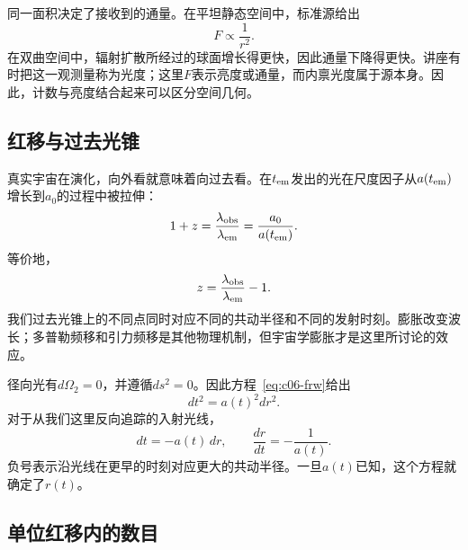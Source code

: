 同一面积决定了接收到的通量。在平坦静态空间中，标准源给出
\begin{equation}
F\propto\frac{1}{r^2}.
\end{equation}
在双曲空间中，辐射扩散所经过的球面增长得更快，因此通量下降得更快。讲座有时把这一观测量称为光度；这里\(F\)表示亮度或通量，而内禀光度属于源本身。因此，计数与亮度结合起来可以区分空间几何。

\subsection{红移与过去光锥}

真实宇宙在演化，向外看就意味着向过去看。在\(t_{\rm em}\)发出的光在尺度因子从\(a(t_{\rm em})\)增长到\(a_0\)的过程中被拉伸：
\begin{equation}
1+z
=\frac{\lambda_{\rm obs}}{\lambda_{\rm em}}
=\frac{a_0}{a(t_{\rm em})}.
\label{eq:c06-redshift}
\end{equation}
等价地，
\begin{equation}
z=\frac{\lambda_{\rm obs}}{\lambda_{\rm em}}-1.
\end{equation}
我们过去光锥上的不同点同时对应不同的共动半径和不同的发射时刻。膨胀改变波长；多普勒频移和引力频移是其他物理机制，但宇宙学膨胀才是这里所讨论的效应。

\begin{classroomqa}
\end{classroomqa}

径向光有\(d\Omega_2=0\)，并遵循\(ds^2=0\)。因此方程~\eqref{eq:c06-frw}给出
\begin{equation}
dt^2=a(t)^2dr^2.
\end{equation}
对于从我们这里反向追踪的入射光线，
\begin{equation}
dt=-a(t)\,dr,
\qquad
\frac{dr}{dt}=-\frac{1}{a(t)}.
\label{eq:c06-null-ray}
\end{equation}
负号表示沿光线在更早的时刻对应更大的共动半径。一旦\(a(t)\)已知，这个方程就确定了\(r(t)\)。

\subsection{单位红移内的数目}

